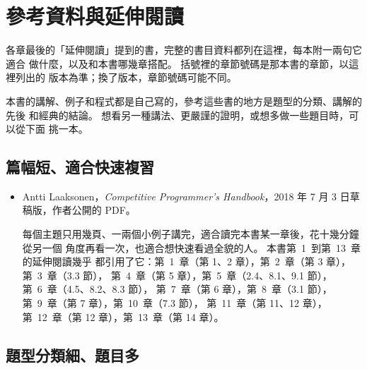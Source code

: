 \chapter*{參考資料與延伸閱讀}
\label{ch:references}

各章最後的「延伸閱讀」提到的書，完整的書目資料都列在這裡，每本附一兩句它適合
做什麼，以及和本書哪幾章搭配。 括號裡的章節號碼是那本書的章節，以這裡列出的
版本為準；換了版本，章節號碼可能不同。

本書的講解、例子和程式都是自己寫的，參考這些書的地方是題型的分類、講解的先後
和經典的結論。 想看另一種講法、更嚴謹的證明，或想多做一些題目時，可以從下面
挑一本。

\section*{篇幅短、適合快速複習}

\begin{itemize}
\item Antti Laaksonen，\textit{Competitive Programmer's Handbook}，2018 年 7 月
3 日草稿版，作者公開的 PDF。

每個主題只用幾頁、一兩個小例子講完，適合讀完本書某一章後，花十幾分鐘從另一個
角度再看一次，也適合想快速看過全貌的人。 本書第~1~到第~13~章的延伸閱讀幾乎
都引用了它：第~1~章（第 1、2 章），第~2~章（第 3 章），第~3~章（3.3 節），
第~4~章（第 5 章），第~5~章（2.4、8.1、9.1 節），第~6~章（4.5、8.2、8.3 節），
第~7~章（第 6 章），第~8~章（3.1 節），第~9~章（第 7 章），第~10~章（7.3 節），
第~11~章（第 11、12 章），第~12~章（第 12 章），第~13~章（第 14 章）。
\end{itemize}

\section*{題型分類細、題目多}

